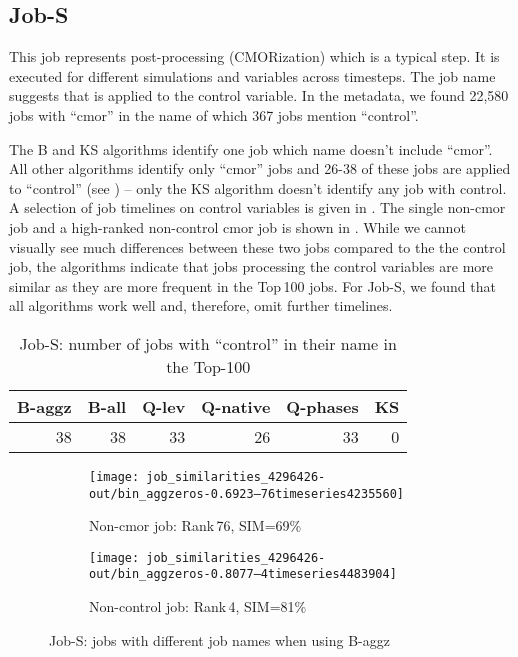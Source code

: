 \documentclass{jhps}
\begin{document}
\subsection{Job-S}

This job represents post-processing (CMORization) which is a typical step.
It is executed for different simulations and variables across timesteps.
The job name suggests that is applied to the control variable.
In the metadata, we found 22,580 jobs with “cmor” in the name of which 367 jobs mention “control”.

The B and KS algorithms identify one job which name doesn't include “cmor”.
All other algorithms identify only “cmor” jobs and 26-38 of these jobs are applied to “control” (see ) -- only the KS algorithm doesn't identify any job with control.
A selection of job timelines on control variables is given in .
The single non-cmor job and a high-ranked non-control cmor job is shown in .
While we cannot visually see much differences between these two jobs compared to the  the control job, the algorithms indicate that jobs processing the control variables are more similar as they are more frequent in the Top\,100 jobs.
For Job-S, we found that all algorithms work well and, therefore, omit further timelines.

\begin{table}[bt]
\centering
\begin{tabular}{r|r|r|r|r|r}
  B-aggz & B-all & Q-lev & Q-native & Q-phases & KS\\ \hline
  38 &   38 &   33 &   26 &   33 &       0
\end{tabular}

  \caption{Job-S: number of jobs with “control” in their name in the Top-100}%
  \label{tbl:control-jobs}
\end{table}

\begin{figure}[bt]
\centering
\begin{subfigure}{0.47\textwidth}
\centering
\texttt{[image: job\_similarities\_4296426-out/bin\_aggzeros-0.6923--76timeseries4235560]}
\caption{Non-cmor job: Rank\,76, SIM=69\%}
\end{subfigure}
\qquad
\begin{subfigure}{0.47\textwidth}
\centering
\texttt{[image: job\_similarities\_4296426-out/bin\_aggzeros-0.8077--4timeseries4483904]}
\caption{Non-control job: Rank\,4, SIM=81\%}
\end{subfigure}

\caption{Job-S: jobs with different job names when using B-aggz}%
\label{fig:job-S-bin-agg}
\end{figure}
\end{document}

